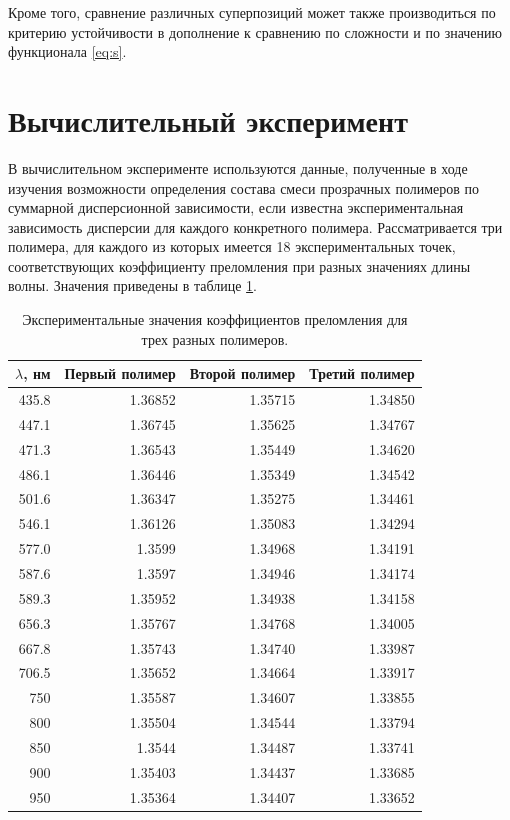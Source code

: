 \documentclass[12pt,a4paper]{article}
\theoremstyle{definition}
\begin{document}
Кроме того, сравнение различных суперпозиций может также производиться по
критерию устойчивости в дополнение к сравнению по сложности и по значению
функционала \eqref{eq:s}.

\section{Вычислительный эксперимент}

В вычислительном эксперименте используются данные, полученные в ходе
изучения возможности определения состава смеси прозрачных
полимеров по суммарной дисперсионной зависимости, если известна экспериментальная
зависимость дисперсии для каждого конкретного полимера. Рассматривается три
полимера, для каждого из которых имеется 18 экспериментальных точек,
соответствующих коэффициенту преломления при разных значениях длины волны.
Значения приведены в таблице \ref{tabl:source_data}.

\begin{table}[h]
  \begin{tabular}{| r | r | r | r |} \hline
	$\lambda$, нм	& Первый полимер & Второй полимер & Третий полимер \\ \hline
	435.8 & 1.36852 & 1.35715 & 1.34850 \\ \hline
	447.1 & 1.36745 & 1.35625 & 1.34767 \\ \hline
	471.3 & 1.36543 & 1.35449 & 1.34620 \\ \hline
	486.1 & 1.36446 & 1.35349 & 1.34542 \\ \hline
	501.6 & 1.36347 & 1.35275 & 1.34461 \\ \hline
	546.1 & 1.36126 & 1.35083 & 1.34294 \\ \hline
	577.0 & 1.3599 & 1.34968 & 1.34191 \\ \hline
	587.6 & 1.3597 & 1.34946 & 1.34174 \\ \hline
	589.3 & 1.35952 & 1.34938 & 1.34158 \\ \hline
	656.3 & 1.35767 & 1.34768 & 1.34005 \\ \hline
	667.8 & 1.35743 & 1.34740 & 1.33987 \\ \hline
	706.5 & 1.35652 & 1.34664 & 1.33917 \\ \hline
	750 & 1.35587 & 1.34607 & 1.33855 \\ \hline
	800 & 1.35504 & 1.34544 & 1.33794 \\ \hline
	850 & 1.3544 & 1.34487 & 1.33741 \\ \hline
	900 & 1.35403 & 1.34437 & 1.33685 \\ \hline
	950 & 1.35364 & 1.34407 & 1.33652 \\ \hline
  \end{tabular}
  \caption{Экспериментальные значения коэффициентов преломления для трех разных полимеров.}
  \label{tabl:source_data}
\end{table}
\end{document}
